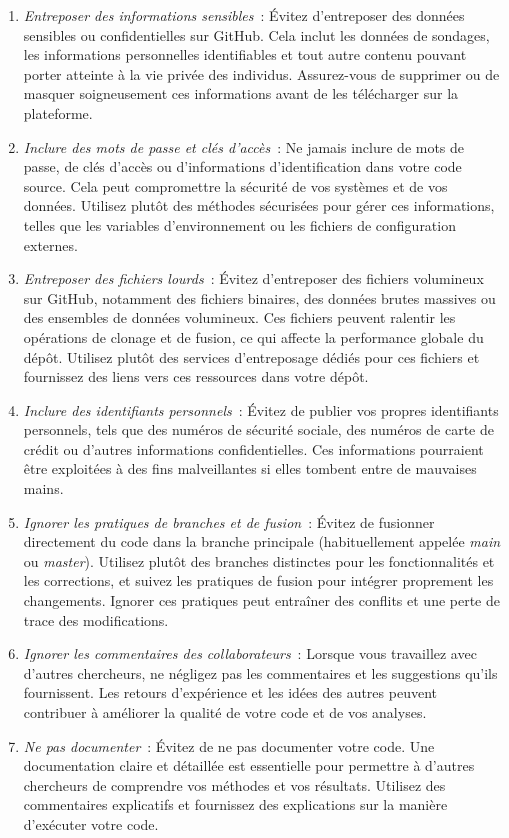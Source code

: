 \documentclass[
  letterpaper,
]{scrbook}
\begin{document}
\begin{enumerate}
\def\labelenumi{\arabic{enumi}.}
\item
  \emph{Entreposer des informations sensibles}~: Évitez d'entreposer des
  données sensibles ou confidentielles sur GitHub. Cela inclut les
  données de sondages, les informations personnelles identifiables et
  tout autre contenu pouvant porter atteinte à la vie privée des
  individus. Assurez-vous de supprimer ou de masquer soigneusement ces
  informations avant de les télécharger sur la plateforme.
\item
  \emph{Inclure des mots de passe et clés d'accès}~: Ne jamais inclure
  de mots de passe, de clés d'accès ou d'informations d'identification
  dans votre code source. Cela peut compromettre la sécurité de vos
  systèmes et de vos données. Utilisez plutôt des méthodes sécurisées
  pour gérer ces informations, telles que les variables d'environnement
  ou les fichiers de configuration externes.
\item
  \emph{Entreposer des fichiers lourds}~: Évitez d'entreposer des
  fichiers volumineux sur GitHub, notamment des fichiers binaires, des
  données brutes massives ou des ensembles de données volumineux. Ces
  fichiers peuvent ralentir les opérations de clonage et de fusion, ce
  qui affecte la performance globale du dépôt. Utilisez plutôt des
  services d'entreposage dédiés pour ces fichiers et fournissez des
  liens vers ces ressources dans votre dépôt.
\item
  \emph{Inclure des identifiants personnels}~: Évitez de publier vos
  propres identifiants personnels, tels que des numéros de sécurité
  sociale, des numéros de carte de crédit ou d'autres informations
  confidentielles. Ces informations pourraient être exploitées à des
  fins malveillantes si elles tombent entre de mauvaises mains.
\item
  \emph{Ignorer les pratiques de branches et de fusion}~: Évitez de
  fusionner directement du code dans la branche principale
  (habituellement appelée \emph{main} ou \emph{master}). Utilisez plutôt
  des branches distinctes pour les fonctionnalités et les corrections,
  et suivez les pratiques de fusion pour intégrer proprement les
  changements. Ignorer ces pratiques peut entraîner des conflits et une
  perte de trace des modifications.
\item
  \emph{Ignorer les commentaires des collaborateurs}~: Lorsque vous
  travaillez avec d'autres chercheurs, ne négligez pas les commentaires
  et les suggestions qu'ils fournissent. Les retours d'expérience et les
  idées des autres peuvent contribuer à améliorer la qualité de votre
  code et de vos analyses.
\item
  \emph{Ne pas documenter}~: Évitez de ne pas documenter votre code. Une
  documentation claire et détaillée est essentielle pour permettre à
  d'autres chercheurs de comprendre vos méthodes et vos résultats.
  Utilisez des commentaires explicatifs et fournissez des explications
  sur la manière d'exécuter votre code.
\end{enumerate}
\end{document}
